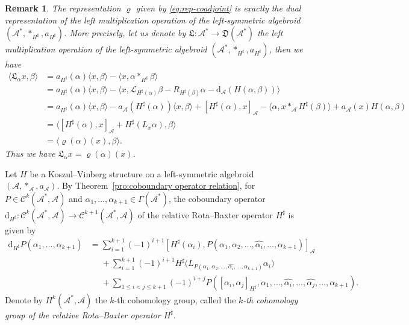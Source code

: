 \documentclass[pdftex]{sigma}%
\numberwithin{equation}{section}
\newtheorem{rmk}[thm]{Remark}
\newcommand{\huaA}{\mathcal{A}}
\newcommand{\huaC}{\mathcal{C}}
\newcommand{\huaL}{\mathcal{L}}
\newcommand{\frkL}{\mathfrak L}
\newcommand{\frkD}{\mathfrak D}
\newcommand{\dM}{\mathrm{d}}
\begin{document}
\begin{rmk}%
The representation $\varrho$ given by \eqref{eq:rep-coadjoint} is exactly the dual representation of the left multiplication operation of the left-symmetric algebroid $(\huaA^*,\ast_{H^\sharp},a_{H^\sharp})$. More precisely, let us denote by $\frkL\colon \huaA^*\longrightarrow \frkD(\huaA^*)$ the left multiplication operation of the left-symmetric algebroid $(\huaA^*,\ast_{H^\sharp},a_{H^\sharp})$, then we have
\begin{align*}
\langle\frkL_\alpha x,\beta\rangle&=a_{H^\sharp}(\alpha)\langle x,\beta\rangle-\langle x,\alpha \ast_{H^\sharp} \beta\rangle
\\
&=a_{H^\sharp}(\alpha)\langle x,\beta\rangle-\langle x,\huaL_{H^\sharp(\alpha)}\beta-R_{H^\sharp(\beta)}\alpha-{\dM_\huaA} (H(\alpha,\beta))\rangle
\\
&=a_{H^\sharp}(\alpha)\langle x,\beta\rangle\!-\!a_\huaA( H^\sharp(\alpha))\langle x,\beta\rangle\!+\![H^\sharp(\alpha),x]_{\huaA}\!-\!\langle\alpha,x\ast_\huaA H^\sharp(\beta)\rangle
\!+\!a_\huaA(x)H(\alpha,\beta)
\\
&=\langle[H^\sharp(\alpha),x]_{\huaA}+H^\sharp(L_x\alpha ),\beta\rangle
\\
&=\langle\varrho(\alpha)(x),\beta\rangle.
\end{align*}
Thus we have $\frkL_\alpha x=\varrho(\alpha)(x)$.
\end{rmk}

Let $H$ be a Koszul--Vinberg structure on a left-symmetric algebroid $(\huaA,\ast_\huaA,a_\huaA)$. By Theo\-rem~\ref{pro:coboundary operator relation}, for $P\in\huaC^k(\huaA^*,\huaA)$ and $\alpha_1,\dots,\alpha_{k+1}\in\Gamma{(\huaA^*)}$, the coboundary operator $\dM_{H^\sharp}\colon \huaC^k(\huaA^*,\huaA)\allowbreak\longrightarrow \huaC^{k+1}(\huaA^*,\huaA)$ of the relative Rota--Baxter operator $H^\sharp$ is given by
\begin{align*}%
\dM_{H^\sharp}P(\alpha_1,\dots,\alpha_{k+1})
&=\sum_{i=1}^{k+1}(-1)^{i+1}[H^\sharp(\alpha_i),P(\alpha_1,\alpha_2,
\dots,\hat{\alpha_i},\dots,\alpha_{k+1})]_{\huaA}
\\
&\phantom{=}+\sum_{i=1}^{k+1}(-1)^{i+1}H^\sharp\big(L_{P(\alpha_1,\alpha_2, \dots,\hat{\alpha_i},\dots,\alpha_{k+1})}\alpha_i\big)
\\
&\phantom{=}+\sum_{1\leq i<j\leq {k+1}}(-1)^{i+j}P([\alpha_i,\alpha_j]_{H^\sharp},\alpha_1, \dots,\hat{\alpha_i},\dots,\hat{\alpha_j},\dots,\alpha_{k+1}).
\end{align*}
Denote by $H^k(\huaA^*,\huaA)$ the $k$-th cohomology group, called the {\it $k$-th cohomology group of the relative Rota--Baxter operator $H^\sharp$}.
\end{document}
